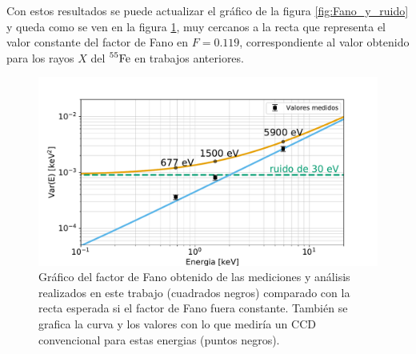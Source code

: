 Con estos resultados se puede actualizar el gráfico de la figura \ref{fig:Fano_y_ruido} y queda como se ven en la figura \ref{fig:Fano_y_ruido_final}, muy cercanos a la recta que representa el valor constante del factor de Fano en $F = 0.119$, correspondiente al valor obtenido para los rayos $X$ del $\prescript{55}{}{\mbox{Fe}}$ en trabajos anteriores\cite{Rodrigues}.
\begin{figure}[H]
    \centering
        \includegraphics[scale=0.5]{Figs/FanoyRuidoFinal.pdf}
    \caption{Gráfico del factor de Fano obtenido de las mediciones y análisis realizados en este trabajo (cuadrados negros) comparado con la recta esperada si el factor de Fano fuera constante. También se grafica la curva y los valores con lo que mediría un CCD convencional para estas energias (puntos negros).}
    \label{fig:Fano_y_ruido_final}
\end{figure}